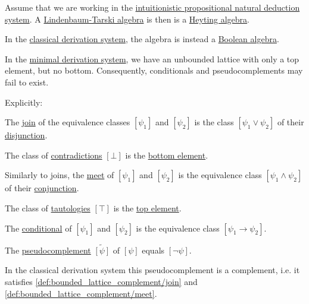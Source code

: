 \begin{proposition}\label{thm:intuitionistic_lindenbaum_tarski_algebra}
  Assume that we are working in the \hyperref[def:intuitionistic_propositional_deductive_systems]{intuitionistic propositional natural deduction system}. A \hyperref[def:lindenbaum_tarski_algebra]{Lindenbaum-Tarski algebra} is then is a \hyperref[def:heyting_algebra]{Heyting algebra}.

  In the \hyperref[def:classical_propositional_deductive_systems]{classical derivation system}, the algebra is instead a \hyperref[def:boolean_algebra]{Boolean algebra}.

  In the \hyperref[def:minimal_propositional_hilbert_system]{minimal derivation system}, we have an unbounded lattice with only a top element, but no bottom. Consequently, conditionals and pseudocomplements may fail to exist.

  Explicitly:
  \begin{thmenum}
     The \hyperref[def:semilattice/join]{join} of the equivalence classes \( [\psi_1] \) and \( [\psi_2] \) is the class \( [\psi_1 \vee \psi_2] \) of their \hyperref[def:propositional_language/connectives/disjunction]{disjunction}.

     The class of \hyperref[def:propositional_semantics/contradiction]{contradictions} \( [\bot] \) is the \hyperref[def:extremal_points/top_and_bottom]{bottom element}.

     Similarly to joins, the \hyperref[def:semilattice/meet]{meet} of \( [\psi_1] \) and \( [\psi_2] \) is the equivalence class \( [\psi_1 \wedge \psi_2] \) of their \hyperref[def:propositional_language/connectives/conjunction]{conjunction}.

     The class of \hyperref[def:propositional_semantics/tautology]{tautologies} \( [\top] \) is the \hyperref[def:extremal_points/top_and_bottom]{top element}.

     The \hyperref[eq:def:heyting_algebra/conditional]{conditional} of \( [\psi_1] \) and \( [\psi_2] \) is the equivalence class \( [\psi_1 \rightarrow \psi_2] \).

     The \hyperref[eq:def:heyting_algebra/pseudocomplement]{pseudocomplement} \( \widetilde{[\psi]} \) of \( [\psi] \) equals \( [\neg \psi] \).

    In the classical derivation system this pseudocomplement is a complement, i.e. it satisfies \eqref{def:bounded_lattice_complement/join} and \eqref{def:bounded_lattice_complement/meet}.
  \end{thmenum}
\end{proposition}

